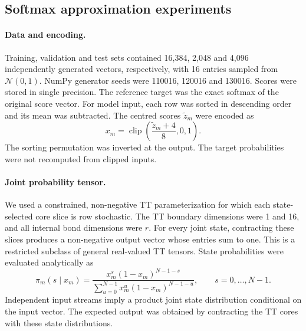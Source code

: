 \subsection{Softmax approximation experiments}
\label{methods:softmax_approximation}

\paragraph{Data and encoding.}
Training, validation and test sets contained 16,384, 2,048 and 4,096
independently generated vectors, respectively, with 16 entries sampled from
$\mathcal{N}(0,1)$. NumPy generator seeds were 110016, 120016 and 130016.
Scores were stored in single precision. The reference target was the exact
softmax of the original score vector. For model input, each row was sorted
in descending order and its mean was subtracted. The centred scores
$\widetilde z_m$ were encoded as
\begin{equation}
x_m=\operatorname{clip}\left(\frac{\widetilde z_m+4}{8},0,1\right).
\end{equation}
The sorting permutation was inverted at the output. The target probabilities
were not recomputed from clipped inputs.

\paragraph{Joint probability tensor.}
We used a constrained, non-negative TT parameterization for which each
state-selected core slice is row stochastic. The TT boundary dimensions
were 1 and 16, and all internal bond dimensions were $r$. For every joint
state, contracting these slices produces a non-negative output vector whose
entries sum to one. This is a restricted subclass of general real-valued
TT tensors. State probabilities were evaluated analytically as
\begin{equation}
\pi_m(s\mid x_m)=
\frac{x_m^s(1-x_m)^{N-1-s}}
{\sum_{u=0}^{N-1}x_m^u(1-x_m)^{N-1-u}},
\qquad s=0,\ldots,N-1.
\end{equation}
Independent input streams imply a product joint state distribution
conditional on the input vector. The expected output was obtained by
contracting the TT cores with these state distributions.

